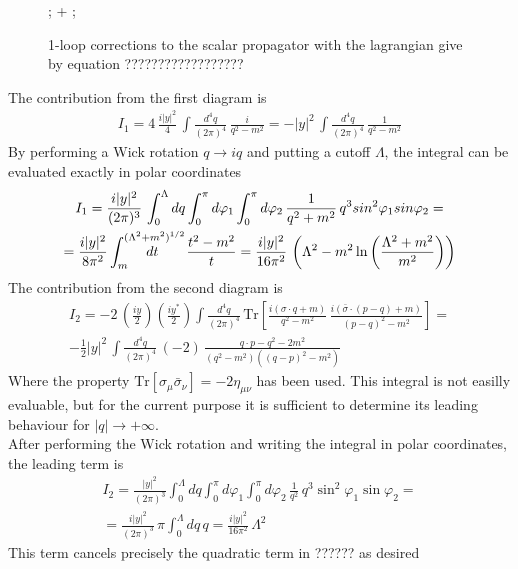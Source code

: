 \documentclass[12pt]{article}
\begin{document}
\begin{figure}[h]
  \centering 
  ; 
\quad + \qquad
{};
\caption{1-loop corrections to the scalar propagator with the lagrangian give by equation ??????????????????}
\end{figure}
\raggedright The contribution from the first diagram is
\begin{gather*}
  I_1 = 4 \,\frac{i|y|^2}{4} \, \int \frac{d^4 q}{(2\pi)^4} \, \frac{i}{q^2 - m^2} = - |y|^2 \, \int \frac{d^4 q}{(2\pi)^4} \, \frac{1}{q^2 - m^2}
\end{gather*}
By performing a Wick rotation $q \to iq$ and putting a cutoff $\Lambda$, the integral can be evaluated exactly in polar coordinates 
\begin{gather*}
  I_1 = \frac{i |y|^2}{(2\pi)^3} \, \int_0^\Lambda dq \int_0^\pi d\varphi_1 \int_0^{\pi} d\varphi_2 \, \frac{1}{q^2 + m^2} \, q^3 sin^2\varphi_1 sin\varphi_2 = \\
  = \frac{i |y|^2}{8\pi^2} \int_{m}^{(\Lambda^2 + m^2)^{1/2}} \hspace{-3em} dt \qquad \frac{t^2 - m^2}{t} = \frac{i|y|^2}{16\pi^2} \, \left(\Lambda^2 - m^2 \ln\left(\frac{\Lambda^2 + m^2}{m^2}\right)\right)
\end{gather*}
The contribution from the second diagram is 
\begin{gather*}
  I_2 = - 2 \, \left(\frac{iy}{2}\right)\left(\frac{iy^*}{2}\right) \int \frac{d^4 q}{(2\pi)^4} \, \text{Tr}\left[\frac{i(\sigma \cdot q + m)}{q^2 - m^2} \, \frac{i(\bar\sigma \cdot (p-q) + m)}{(p-q)^2 - m^2}\right] = \\
  - \frac{1}{2} |y|^2 \, \int \frac{d^4 q}{(2\pi)^4} \, (-2) \, \frac{q\cdot p - q^2 - 2m^2}{(q^2-m^2) ((q-p)^2-m^2)}
\end{gather*}
Where the property $\text{Tr}[\sigma_\mu \bar\sigma_\nu] = -2\eta_{\mu\nu}$ has been used. This integral is not easilly evaluable, but for the current purpose it is sufficient to determine its leading behaviour for $|q| \to +\infty$. \\
After performing the Wick rotation and writing the integral in polar coordinates, the leading term is 
\begin{gather*}
  I_2 = \frac{|y|^2}{(2\pi)^3} \int_0^\Lambda dq \int_0^\pi d\varphi_1 \int_0^{\pi} d\varphi_2 \, \frac{1}{q^2} \, q^3\sin^2\varphi_1\sin\varphi_2 = \\ 
  = \frac{i|y|^2}{(2\pi)^3} \, \pi \int_0^\Lambda dq \, q = \frac{i|y|^2}{16\pi^2} \, \Lambda^2
\end{gather*}
This term cancels precisely the quadratic term in ?????? as desired
\end{document}
